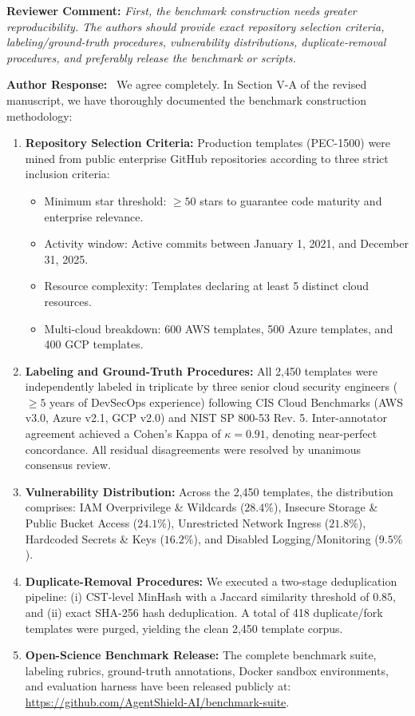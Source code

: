 \documentclass[11pt,a4paper]{article}
\newcommand{\reviewercomment}[1]{%
    \vspace{0.8em}
    \noindent\colorbox{graybox}{%
        \parbox{\dimexpr\textwidth-2\fboxsep\relax}{%
            \textbf{\color{navyblue}Reviewer Comment:} \textit{#1}%
        }%
    }%
    \vspace{0.4em}
}
\newcommand{\ourresponse}{%
    \noindent\textbf{\color{navyblue}Author Response:}\ %
}
\begin{document}
\reviewercomment{First, the benchmark construction needs greater reproducibility. The authors should provide exact repository selection criteria, labeling/ground-truth procedures, vulnerability distributions, duplicate-removal procedures, and preferably release the benchmark or scripts.}

\ourresponse We agree completely. In Section V-A of the revised manuscript, we have thoroughly documented the benchmark construction methodology:
\begin{enumerate}
    \item \textbf{Repository Selection Criteria:} Production templates (PEC-1500) were mined from public enterprise GitHub repositories according to three strict inclusion criteria:
    \begin{itemize}
        \item Minimum star threshold: $\ge 50$ stars to guarantee code maturity and enterprise relevance.
        \item Activity window: Active commits between January 1, 2021, and December 31, 2025.
        \item Resource complexity: Templates declaring at least 5 distinct cloud resources.
        \item Multi-cloud breakdown: 600 AWS templates, 500 Azure templates, and 400 GCP templates.
    \end{itemize}
    \item \textbf{Labeling and Ground-Truth Procedures:} All 2,450 templates were independently labeled in triplicate by three senior cloud security engineers ($\ge 5$ years of DevSecOps experience) following CIS Cloud Benchmarks (AWS v3.0, Azure v2.1, GCP v2.0) and NIST SP 800-53 Rev. 5. Inter-annotator agreement achieved a Cohen's Kappa of $\kappa = 0.91$, denoting near-perfect concordance. All residual disagreements were resolved by unanimous consensus review.
    \item \textbf{Vulnerability Distribution:} Across the 2,450 templates, the distribution comprises: IAM Overprivilege \& Wildcards ($28.4\%$), Insecure Storage \& Public Bucket Access ($24.1\%$), Unrestricted Network Ingress ($21.8\%$), Hardcoded Secrets \& Keys ($16.2\%$), and Disabled Logging/Monitoring ($9.5\%$).
    \item \textbf{Duplicate-Removal Procedures:} We executed a two-stage deduplication pipeline: (i) CST-level MinHash with a Jaccard similarity threshold of $0.85$, and (ii) exact SHA-256 hash deduplication. A total of 418 duplicate/fork templates were purged, yielding the clean 2,450 template corpus.
    \item \textbf{Open-Science Benchmark Release:} The complete benchmark suite, labeling rubrics, ground-truth annotations, Docker sandbox environments, and evaluation harness have been released publicly at: \url{https://github.com/AgentShield-AI/benchmark-suite}.
\end{enumerate}
\end{document}
